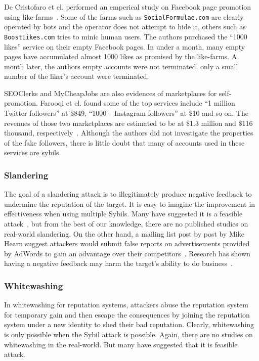 De Cristofaro et el. performed an emperical study on Facebook page promotion
using like-farms~\cite{de2014paying}. Some of the farms such as
\verb!SocialFormulae.com! are clearly operated by bots and the operator does not
attempt to hide it, others such as \verb!BoostLikes.com! tries to minic human
users. The authors purchased the ``1000 likes'' service on their empty Facebook
pages. In under a month, many empty pages have accumulated almost 1000 likes as
promised by the like-farms. A month later, the authors empty accounts were not
terminated, only a small number of the liker's account were terminated.


SEOClerks and MyCheapJobs are also evidences of marketplaces for self-promotion.
Farooqi et el. found some of the top services include ``1 million Twitter
followers'' at \$849, ``1000+ Instagram followers'' at \$10 and so on. The
revenues of those two marketplaces are estimated to be at \$1.3 million and
\$116 thousand, respectively~\cite{farooqi2015characterizing}. Although the
authors did not investigate the properties of the fake followers, there is
little doubt that many of accounts used in these services are sybils.

\subsubsection{Slandering}
The goal of a slandering attack is to illegitimately produce negative feedback
to undermine the reputation of the target. It is easy to imagine the improvement
in effectiveness when using multiple Sybils. Many have suggested it is a
feasible attack~\cite{hoffman2009survey, koutrouli2012taxonomy}, but from the
best of our knowledge, there are no published studies on real-world slandering.
On the other hand, a mailing list post by post by Mike Hearn suggest attackers
would submit false reports on advertisements provided by AdWords to gain an
advantage over their competitors~\cite{adwords}. Research has shown having a
negative feedback may harm the target's ability to do
business~\cite{ba2002evidence}.

\subsubsection{Whitewashing}
In whitewashing for reputation systems, attackers abuse the reputation system
for temporary gain and then escape the consequences by joining the reputation
system under a new identity to shed their bad reputation. Clearly, whitewashing
is only possible when the Sybil attack is possible. Again, there are no studies
on whitewashing in the real-world. But many have suggested that it is feasible
attack\cite{hoffman2009survey, marti2006taxonomy}.


